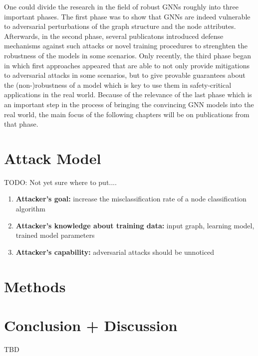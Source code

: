 \documentclass[a4paper,preprint]{sig-alternate}
\begin{document}
One could divide the research in the field of robust GNNs roughly into three important phases.
The first phase was to show that GNNs are indeed vulnerable to adversarial perturbations of the graph structure and the node attributes.
Afterwards, in the second phase, several publicatons introduced defense mechanisms against such attacks or novel training procedures 
to strenghten the robustness of the models in some scenarios. Only recently, the third phase began in which first approaches appeared
that are able to not only provide mitigations to adversarial attacks in some scenarios, but to give provable guarantees about the (non-)robustness 
of a model which is key to use them in safety-critical applications in the real world. Because of the relevance of the last phase which 
is an important step in the process of bringing the convincing GNN models into the real world, the main focus of the following chapters
will be on publications from that phase.

\section{Attack Model}

TODO: Not yet sure where to put....

\begin{enumerate}
    \item \textbf{Attacker's goal:} increase the misclassification rate of a node classification algorithm
    \item \textbf{Attacker's knowledge about training data:} input graph, learning model, trained model parameters
    \item \textbf{Attacker's capability:} adversarial attacks should be unnoticed 
\end{enumerate}

\section{Methods}

\pagebreak

\section{Conclusion + Discussion}
TBD

\pagebreak



\end{document}
